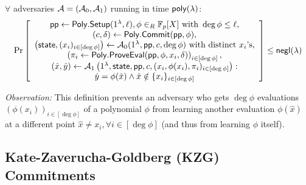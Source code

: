 \begin{definition}
\label{def:polycommit:comp-hiding}
$\forall$ adversaries $\mathcal{A}=(\mathcal{A}_0,\mathcal{A}_1)$ running in time $\mathsf{poly}(\lambda)$:
\begin{align*}
\Pr \left[ \begin{array}{c}
    \mathsf{pp} \leftarrow \mathsf{Poly.Setup}(1^\lambda, \ell), 
    \phi \in_R \mathbb{F}_p[X]\ \text{with}\ \deg{\phi}\le \ell,\\
    (c, \delta) \leftarrow \mathsf{Poly.Commit}(\mathsf{pp}, \phi),\\
    \left(\mathsf{state}, (x_i)_{i\in [\deg{\phi}]}\right) \leftarrow \mathcal{A}_0(1^\lambda, \mathsf{pp}, c, \deg{\phi})\ \text{with distinct}\ x_i\text{'s},\\
    \left( \pi_i \leftarrow \mathsf{Poly.ProveEval}(\mathsf{pp}, \phi, x_i, \delta) \right)_{i\in[\deg{\phi}]},\\
    (\hat{x}, \hat{y}) \leftarrow \mathcal{A}_1\left(1^\lambda, \mathsf{state}, \mathsf{pp}, c, (x_i, \phi(x_i), \pi_i)_{i\in[\deg{\phi}]}\right):\\
    {\hat{y} = \phi(\hat{x})} \wedge {\hat{x} \notin \{x_i\}_{i\in[\deg{\phi}]}}
\end{array} \right] \le \mathsf{negl}(\lambda)
\end{align*}
\end{definition}

\noindent \textit{Observation:}
This definition prevents an adversary who gets $\deg{\phi}$ evaluations $(\phi(x_i))_{i\in[\deg{\phi}]}$ of a polynomial $\phi$ from learning another evaluation $\phi(\hat{x})$ at a different point $\hat{x} \ne x_i, \forall i \in[\deg{\phi}]$ (and thus from learning $\phi$ itself).

\subsection{Kate-Zaverucha-Goldberg (KZG) Commitments}
\label{s:prelim:polycommit:kzg}

